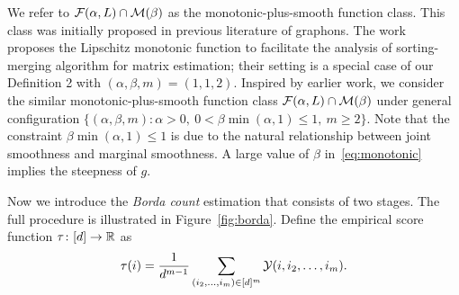\documentclass[12pt]{article}
\theoremstyle{definition}
\begin{document}
 
 
{\color{blue}We refer to $\mathcal{F}(\alpha,L)\cap \mathcal{M}(\beta)$ as the monotonic-plus-smooth function class. This class was initially proposed in previous literature of graphons. The work~\cite{chan2014consistent} proposes the Lipschitz monotonic function to facilitate the analysis of sorting-merging algorithm for matrix estimation; their setting is a special case of our Definition 2 with $(\alpha,\beta,m)=(1,1,2)$. Inspired by earlier work, we consider the similar monotonic-plus-smooth function class $\mathcal{F}(\alpha,L)\cap \mathcal{M}(\beta)$ under general configuration $\{(\alpha,\beta,m): \alpha>0,\ 0<\beta\min(\alpha,1)\leq 1, \ m\geq 2\}$. Note that the constraint $\beta \min(\alpha, 1) \leq 1$ is due to the natural relationship between joint smoothness and marginal smoothness. }A large value of $\beta$ in~\eqref{eq:monotonic} implies the steepness of $g$.

Now we introduce the \emph{Borda count} estimation that consists of two stages. The full procedure is illustrated in Figure~\ref{fig:borda}. Define the empirical score function $\tau\colon [d]\rightarrow\mathbb{R}$ as 
\[
\tau(i) = \frac{1}{d^{m-1}}\sum_{(i_2,\ldots,i_m)\in[d]^m} \mathcal{Y}(i,i_2,\ldots,i_m).
\] 
\end{document}
